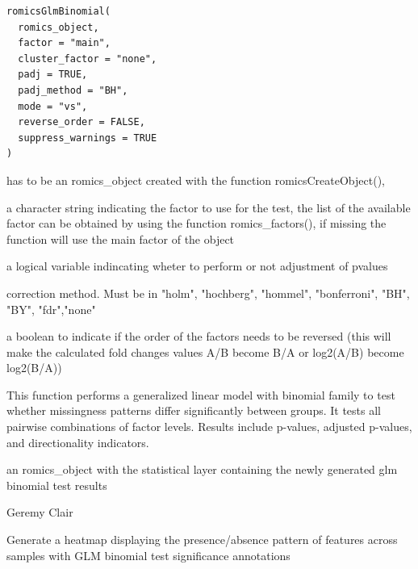 \documentclass[a4paper]{book}
\begin{document}
%
\begin{Usage}
\begin{verbatim}
romicsGlmBinomial(
  romics_object,
  factor = "main",
  cluster_factor = "none",
  padj = TRUE,
  padj_method = "BH",
  mode = "vs",
  reverse_order = FALSE,
  suppress_warnings = TRUE
)
\end{verbatim}
\end{Usage}
%
\begin{Arguments}
\begin{ldescription}
\item[\code{romics\_object}] has to be an romics\_object created with the function romicsCreateObject(),

\item[\code{factor}] a character string indicating the factor to use for the test, the list of the available factor can be obtained by using the function romics\_factors(), if missing the function will use the main factor of the object

\item[\code{padj}] a logical variable indincating wheter to perform or not adjustment of pvalues

\item[\code{padj\_method}] correction method. Must be in  "holm", "hochberg", "hommel", "bonferroni", "BH", "BY", "fdr","none"

\item[\code{reverse\_order}] a boolean to indicate if the order of the factors needs to be reversed (this will make the calculated fold changes values A/B become B/A or log2(A/B) become log2(B/A))
\end{ldescription}
\end{Arguments}
%
\begin{Details}
This function performs a generalized linear model with binomial family to test whether missingness patterns differ significantly between groups. It tests all pairwise combinations of factor levels. Results include p-values, adjusted p-values, and directionality indicators.
\end{Details}
%
\begin{Value}
an romics\_object with the statistical layer containing the newly generated glm binomial test results
\end{Value}
%
\begin{Author}
Geremy Clair
\end{Author}
%
\begin{Description}
Generate a heatmap displaying the presence/absence pattern of features across samples with GLM binomial test significance annotations
\end{Description}
\end{document}
